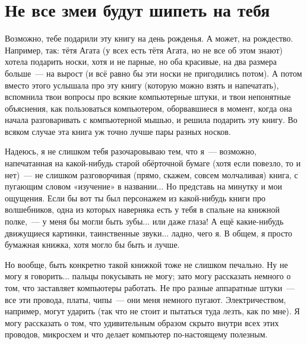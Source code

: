 
\chapter{Не все змеи будут шипеть на тебя}

Возможно, тебе подарили эту книгу на день рожденья. А может, на рождество. Например, так: тётя Агата (у всех есть тётя Агата, но не все об этом знают) хотела подарить носки, хотя и не парные, но оба красивые, на два размера больше — на вырост (и всё равно бы эти носки не пригодились потом). А потом вместо этого услышала про эту книгу (которую можно взять и напечатать), вспомнила твои вопросы про всякие компьютерные штуки, и твои непонятные объяснения, как пользоваться компьютером, оборвавшиеся в момент, когда она начала разговаривать с компьютерной мышью, и решила подарить эту книгу. Во всяком случае эта книга уж точно лучше пары разных носков.

Надеюсь, я не слишком тебя разочаровываю тем, что я — возможно, напечатанная на какой-нибудь старой обёрточной бумаге (хотя если повезло, то и нет) — не слишком разговорчивая (прямо, скажем, совсем молчаливая) книга, с пугающим словом «изучение» в названии... Но представь на минутку и мои ощущения. Если бы вот ты был персонажем из какой-нибудь книги про волшебников, одна из которых наверняка есть у тебя в спальне на книжной полке, — у меня бы могли быть зубы... или даже глаза! А ещё какие-нибудь движущиеся картинки, таинственные звуки... ладно, чего я. В общем, я просто бумажная книжка, хотя могло бы быть и лучше.


Но вообще, быть конкретно такой книжкой тоже не слишком печально. Ну не могу я говорить... пальцы покусывать не могу; зато могу рассказать немного о том, что заставляет компьютеры работать. Не про разные аппаратные штуки — все эти провода, платы, чипы — они меня немного пугают. Электричеством, например, могут ударить (так что не стоит и пытаться туда лезть, как по мне). Я могу рассказать о том, что удивительным образом скрыто внутри всех этих проводов, микросхем и что делает компьютер по-настоящему полезным.

